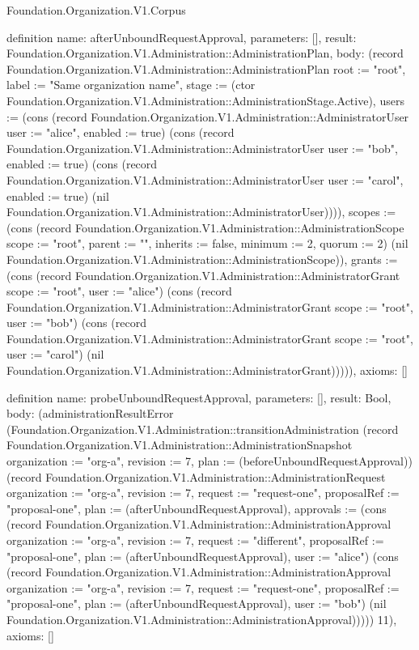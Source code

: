 \begin{lexlean}{Foundation.Organization.V1.Corpus}
\begin{semanticmodule}
definition{
  name: afterUnboundRequestApproval,
  parameters: [],
  result: Foundation.Organization.V1.Administration::AdministrationPlan,
  body: (record Foundation.Organization.V1.Administration::AdministrationPlan {root := "root", label := "Same organization name", stage := (ctor Foundation.Organization.V1.Administration::AdministrationStage.Active), users := (cons (record Foundation.Organization.V1.Administration::AdministratorUser {user := "alice", enabled := true}) (cons (record Foundation.Organization.V1.Administration::AdministratorUser {user := "bob", enabled := true}) (cons (record Foundation.Organization.V1.Administration::AdministratorUser {user := "carol", enabled := true}) (nil Foundation.Organization.V1.Administration::AdministratorUser)))), scopes := (cons (record Foundation.Organization.V1.Administration::AdministrationScope {scope := "root", parent := "", inherits := false, minimum := 2, quorum := 2}) (nil Foundation.Organization.V1.Administration::AdministrationScope)), grants := (cons (record Foundation.Organization.V1.Administration::AdministratorGrant {scope := "root", user := "alice"}) (cons (record Foundation.Organization.V1.Administration::AdministratorGrant {scope := "root", user := "bob"}) (cons (record Foundation.Organization.V1.Administration::AdministratorGrant {scope := "root", user := "carol"}) (nil Foundation.Organization.V1.Administration::AdministratorGrant))))}),
  axioms: []
}

definition{
  name: probeUnboundRequestApproval,
  parameters: [],
  result: Bool,
  body: (administrationResultError (Foundation.Organization.V1.Administration::transitionAdministration (record Foundation.Organization.V1.Administration::AdministrationSnapshot {organization := "org-a", revision := 7, plan := (beforeUnboundRequestApproval)}) (record Foundation.Organization.V1.Administration::AdministrationRequest {organization := "org-a", revision := 7, request := "request-one", proposalRef := "proposal-one", plan := (afterUnboundRequestApproval), approvals := (cons (record Foundation.Organization.V1.Administration::AdministrationApproval {organization := "org-a", revision := 7, request := "different", proposalRef := "proposal-one", plan := (afterUnboundRequestApproval), user := "alice"}) (cons (record Foundation.Organization.V1.Administration::AdministrationApproval {organization := "org-a", revision := 7, request := "request-one", proposalRef := "proposal-one", plan := (afterUnboundRequestApproval), user := "bob"}) (nil Foundation.Organization.V1.Administration::AdministrationApproval)))})) 11),
  axioms: []
}


\end{semanticmodule}
\end{lexlean}
